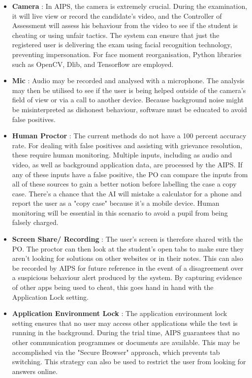\documentclass[10pt,a4paper,twoside]{article}
\begin{document}
\begin{itemize}
\item \textbf{Camera}  : In AIPS, the camera is extremely crucial. During the examination, it will live view or record the candidate's video, and the Controller of Assessment will assess his behaviour from the video to see if the student is cheating or using unfair tactics. The system can ensure that just the registered user is delivering the exam using facial recognition technology, preventing impersonation. For face moment reorganisation, Python libraries such as OpenCV, Dlib, and Tensorflow are employed.

\item \textbf{Mic} : Audio may be recorded and analysed with a microphone. The analysis may then be utilised to see if the user is being helped outside of the camera's field of view or via a call to another device. Because background noise might be misinterpreted as dishonest behaviour, software must be educated to avoid false positives.

\item \textbf{Human Proctor} : The current methods do not have a 100 percent accuracy rate. For dealing with false positives and assisting with grievance resolution, these require human monitoring. Multiple inputs, including as audio and video, as well as background application data, are processed by the AIPS. If any of these inputs have a false positive, the PO can compare the inputs from all of these sources to gain a better notion before labelling the case a copy case. There's a chance that the AI will mistake a calculator for a phone and report the user as a "copy case" because it's a mobile device. Human monitoring will be essential in this scenario to avoid a pupil from being falsely charged.

\item \textbf{Screen Share/ Recording } : The user's screen is therefore shared with the PO. The proctor can then look at the student's open tabs to make sure they aren't looking for solutions on other websites or in their notes. This can also be recorded by AIPS for future reference in the event of a disagreement over a suspicious behaviour alert produced by the system. By capturing evidence of other apps being used to cheat, this goes hand in hand with the Application Lock setting.

\item \textbf{Application Environment Lock} : The application environment lock setting ensures that no user may access other applications while the test is running in the background. During the trial time, AIPS guarantees that no other communication programmes or documents are available. This may be accomplished via the "Secure Browser" approach, which prevents tab switching. This strategy can also be used to restrict the user from looking for answers online.


\end{itemize}
\end{document}
